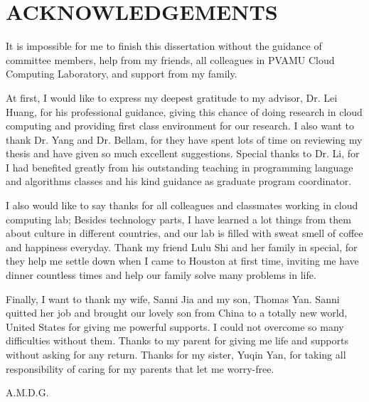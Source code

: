 %
%
%


\chapter*{ACKNOWLEDGEMENTS}

It is impossible for me to finish this dissertation without the guidance of committee members, help from my friends, all colleagues in PVAMU Cloud Computing Laboratory, and support from my family.

At first, I would like to express my deepest gratitude to my advisor, Dr. Lei Huang, for his professional guidance, giving this chance of doing research in cloud computing and providing first class environment for our research. I also want to thank Dr. Yang and Dr. Bellam, for they have spent lots of time on reviewing my thesis and have given so much excellent suggestions. Special thanks to Dr. Li, for I had benefited greatly from his outstanding teaching in programming language and algorithms classes and his kind guidance as graduate program coordinator.

I also would like to say thanks for all colleagues and classmates working in cloud computing lab; Besides technology parts, I have learned a lot things from them about culture in different countries, and our lab is filled with sweat smell of coffee and happiness everyday. Thank my friend Lulu Shi and her family in special, for they help me settle down when I came to Houston at first time, inviting me have dinner countless times and help our family solve many problems in life.

Finally, I want to thank my wife, Sanni Jia and my son, Thomas Yan. Sanni quitted her job and brought our lovely son from China to a totally new world, United States for giving me powerful supports. I could not overcome so many difficulties without them. Thanks to my parent for giving me life and supports without asking for any return. Thanks for my sister, Yuqin Yan, for taking all responsibility of caring for my parents that let me worry-free.   


\pagebreak{}
\vspace*{\fill}
\begin{center}
A.M.D.G.
\end{center}
\vspace*{\fill}
\pagebreak{}
